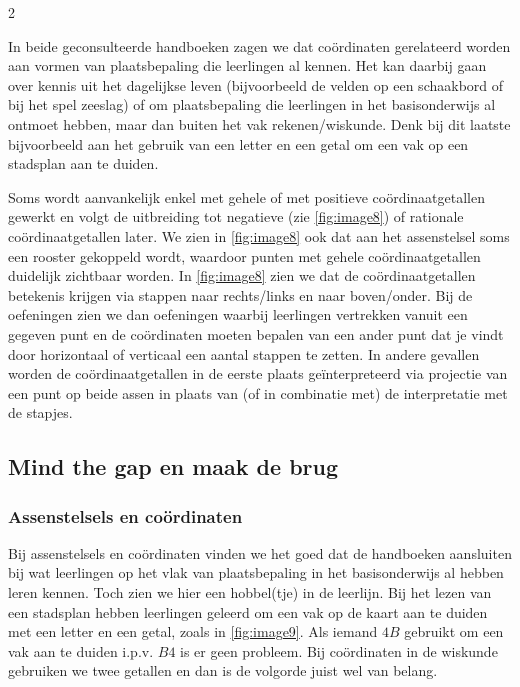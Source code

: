 \begin{multicols}{2}

In beide geconsulteerde handboeken zagen we dat coördinaten gerelateerd worden aan vormen van plaatsbepaling die leerlingen al kennen.
Het kan daarbij gaan over kennis uit het dagelijkse leven (bijvoorbeeld de velden op een schaakbord of bij het spel zeeslag) of om plaatsbepaling die leerlingen in het basisonderwijs al ontmoet hebben, maar dan buiten het vak rekenen/wiskunde.
Denk bij dit laatste bijvoorbeeld aan het gebruik van een letter en een getal om een vak op een stadsplan aan te duiden.

Soms wordt aanvankelijk enkel met gehele of met positieve coördinaatgetallen gewerkt en volgt de uitbreiding tot negatieve (zie \autoref{fig:image8}) of rationale coördinaatgetallen later.
We zien in \autoref{fig:image8} ook dat aan het assenstelsel soms een rooster gekoppeld wordt, waardoor punten met gehele coördinaatgetallen duidelijk zichtbaar worden.
In \autoref{fig:image8} zien we dat de coördinaatgetallen betekenis krijgen via stappen naar rechts/links en naar boven/onder.
Bij de oefeningen zien we dan oefeningen waarbij leerlingen vertrekken vanuit een gegeven punt en de coördinaten moeten bepalen van een ander punt dat je vindt door horizontaal of verticaal een aantal stappen te zetten.
In andere gevallen worden de coördinaatgetallen in de eerste plaats geïnterpreteerd via projectie van een punt op beide assen in plaats van (of in combinatie met) de interpretatie met de stapjes.

\subsection{Mind the gap en maak de brug}

\subsubsection*{Assenstelsels en coördinaten}

Bij assenstelsels en coördinaten vinden we het goed dat de handboeken aansluiten bij wat leerlingen op het vlak van plaatsbepaling in het basisonderwijs al hebben leren kennen.
Toch zien we hier een hobbel(tje) in de leerlijn.
Bij het lezen van een stadsplan hebben leerlingen geleerd om een vak op de kaart aan te duiden met een letter en een getal, zoals in \autoref{fig:image9}.
Als iemand \(4B\) gebruikt om een vak aan te duiden i.p.v. \(B4\) is er geen probleem. Bij coördinaten in de wiskunde gebruiken we twee getallen en dan is de volgorde juist wel van belang.


\end{multicols}
